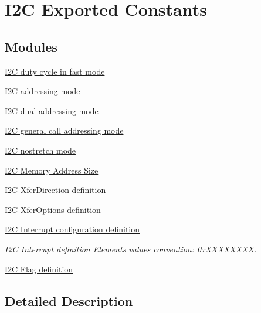 \hypertarget{group___i2_c___exported___constants}{}\section{I2C Exported Constants}
\label{group___i2_c___exported___constants}
\subsection*{Modules}
\begin{DoxyCompactItemize}
\item 
\hyperlink{group___i2_c__duty__cycle__in__fast__mode}{I2\+C duty cycle in fast mode}
\item 
\hyperlink{group___i2_c__addressing__mode}{I2\+C addressing mode}
\item 
\hyperlink{group___i2_c__dual__addressing__mode}{I2\+C dual addressing mode}
\item 
\hyperlink{group___i2_c__general__call__addressing__mode}{I2\+C general call addressing mode}
\item 
\hyperlink{group___i2_c__nostretch__mode}{I2\+C nostretch mode}
\item 
\hyperlink{group___i2_c___memory___address___size}{I2\+C Memory Address Size}
\item 
\hyperlink{group___i2_c___xfer_direction__definition}{I2\+C Xfer\+Direction definition}
\item 
\hyperlink{group___i2_c___xfer_options__definition}{I2\+C Xfer\+Options definition}
\item 
\hyperlink{group___i2_c___interrupt__configuration__definition}{I2\+C Interrupt configuration definition}
\begin{DoxyCompactList}\small\item\em I2C Interrupt definition Elements values convention\+: 0x\+X\+X\+X\+X\+X\+X\+XX. \end{DoxyCompactList}\item 
\hyperlink{group___i2_c___flag__definition}{I2\+C Flag definition}
\end{DoxyCompactItemize}


\subsection{Detailed Description}
